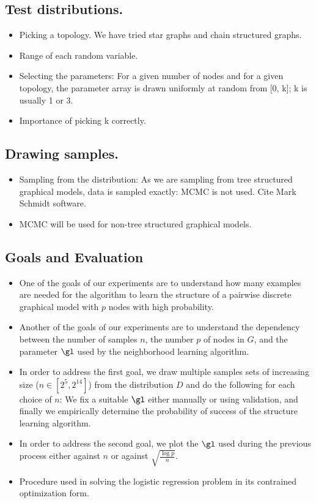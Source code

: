 \documentclass{article}
\begin{document}
\subsection{Test distributions.}
\begin{itemize}
 \item Picking a topology. We have tried star graphs and chain structured graphs.
 \item Range of each random variable.
 \item Selecting the parameters: For a given number of nodes and for a given topology, the parameter array is drawn uniformly at random from [0, k]; k is usually 1 or 3.
 \item Importance of picking k correctly.
\end{itemize}

\subsection{Drawing samples.}
\begin{itemize}
 \item Sampling from the distribution: As we are sampling from tree structured graphical models, data is sampled exactly: MCMC is not used. Cite Mark Schmidt software.
 \item MCMC will be used for non-tree structured graphical models.
\end{itemize}

\subsection{Goals and Evaluation}
\begin{itemize}
 \item One of the goals of our experiments are to understand how many examples are needed for the algorithm to learn the structure of a pairwise discrete graphical model with $p$ nodes with high probability.
 \item Another of the goals of our experiments are to understand the dependency between the number of samples $n$, the number $p$ of nodes in $G$, and the parameter $\gl$ used by the neighborhood learning algorithm.
 \item In order to address the first goal, we draw multiple samples sets of increasing size ($n \in [2^{5}, 2^{14}]$) from the distribution $D$ and do the following for each choice of $n$: We fix a suitable $\gl$ either manually or using validation, and finally we empirically determine the probability of success of the structure learning algorithm.
 \item In order to address the second goal, we plot the $\gl$ used during the previous process either against $n$ or against $\sqrt{\frac{\log p}{n}}$.
 \item Procedure used in solving the logistic regression problem in its contrained optimization form.
\end{itemize}
\end{document}
